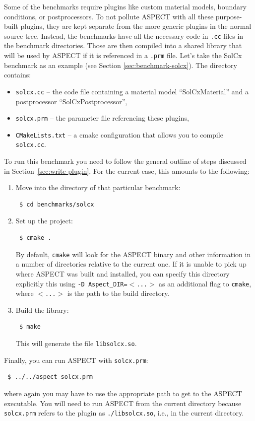 \documentclass{article}
\newcommand{\aspect}{\textsc{ASPECT}}
\begin{document}
Some of the benchmarks require plugins like custom material models, boundary
conditions, or postprocessors. To not pollute \aspect{} with all these
purpose-built plugins, they are kept separate from the more generic plugins in
the normal source tree. Instead, the benchmarks have all the necessary code in
\texttt{.cc} files in the benchmark directories. Those are then compiled into a shared
library that will be used by \aspect{} if it is referenced in a \texttt{.prm}
file. Let's take the SolCx benchmark as an example (see Section \ref{sec:benchmark-solcx}).
The directory contains:
\begin{itemize}
 \item \texttt{solcx.cc} -- the code file containing a material model
   ``SolCxMaterial'' and a postprocessor ``SolCxPostprocessor'',
 \item \texttt{solcx.prm} -- the parameter file referencing these plugins,
 \item \texttt{CMakeLists.txt} -- a cmake configuration that allows you to
   compile \texttt{solcx.cc}.
\end{itemize}
To run this benchmark you need to follow the general outline of
steps discussed in Section~\ref{sec:write-plugin}. For the current case, this
amounts to the following:
\begin{enumerate}
 \item Move into the directory of that particular benchmark:
\begin{verbatim}
 $ cd benchmarks/solcx
\end{verbatim} 
 \item Set up the project:
\begin{verbatim}
 $ cmake .  
\end{verbatim}
 By default, \texttt{cmake} will look for the \aspect{} binary and other
 information in a number of directories relative to the current one.
 If it is unable to pick up where \aspect{} was built and installed, you can
 specify this directory explicitly this using \texttt{-D
   Aspect\_DIR=$<$...$>$} as an additional flag to \texttt{cmake}, where
 \texttt{$<$...$>$} is the path to the build directory.
 \item Build the library:
\begin{verbatim}
 $ make
\end{verbatim}
 This will generate the file \texttt{libsolcx.so}.
\end{enumerate}
Finally, you can run \aspect{} with \texttt{solcx.prm}:
\begin{verbatim}
 $ ../../aspect solcx.prm
\end{verbatim}
where again you may have to use the appropriate path to get to the \aspect{}
executable. You will need to run \aspect{} from the current directory because
\texttt{solcx.prm} refers to the plugin as \texttt{./libsolcx.so}, i.e., in
the current directory.
\end{document}
